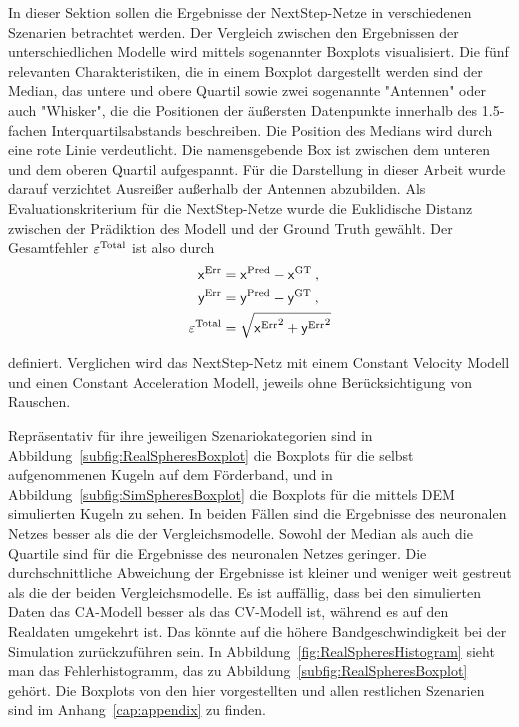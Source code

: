 In dieser Sektion sollen die Ergebnisse der NextStep-Netze in verschiedenen Szenarien betrachtet werden.
Der Vergleich zwischen den Ergebnissen der unterschiedlichen Modelle wird mittels sogenannter Boxplots visualisiert.
Die fünf relevanten Charakteristiken, die in einem Boxplot dargestellt werden sind 
der Median, das untere und obere Quartil sowie zwei sogenannte "Antennen" oder auch "Whisker", die die Positionen der äußersten Datenpunkte innerhalb des 1.5-fachen Interquartilsabstands beschreiben.
Die Position des Medians wird durch eine rote Linie verdeutlicht.
Die namensgebende Box ist zwischen dem unteren und dem oberen Quartil aufgespannt.
Für die Darstellung in dieser Arbeit wurde darauf verzichtet Ausreißer außerhalb der Antennen abzubilden.
Als Evaluationskriterium für die NextStep-Netze wurde die Euklidische Distanz zwischen der Prädiktion des Modell und der Ground Truth gewählt.
Der Gesamtfehler \(\varepsilon{^{\text{Total}}} \) ist also durch 
% 
\begin{align*}
    \mathsf{x}{^{\text{Err}}} &=  \mathsf{x}{^{\text{Pred}}} -  \mathsf{x}{^{\text{GT}}} \: ,\\
    \mathsf{y}{^{\text{Err}}} &=  \mathsf{y}{^{\text{Pred}}} -  \mathsf{y}{^{\text{GT}}} \: ,\\
    \varepsilon{^{\text{Total}}} &= \sqrt{ \mathsf{x}{^{\text{Err}}}^2 +  \mathsf{y}{^{\text{Err}}}^2}
\end{align*}

definiert. Verglichen wird das NextStep-Netz mit einem Constant Velocity Modell und einen Constant Acceleration Modell, jeweils ohne Berücksichtigung von Rauschen. 

Repräsentativ für ihre jeweiligen Szenariokategorien sind in Abbildung~\ref{subfig:RealSpheresBoxplot} die Boxplots für die selbst aufgenommenen Kugeln auf dem Förderband,
und in Abbildung~\ref{subfig:SimSpheresBoxplot} die Boxplots für die mittels DEM simulierten Kugeln zu sehen.
In beiden Fällen sind die Ergebnisse des neuronalen Netzes besser als die der Vergleichsmodelle.
Sowohl der Median als auch die Quartile sind für die Ergebnisse des neuronalen Netzes geringer.
Die durchschnittliche Abweichung der Ergebnisse ist kleiner und weniger weit gestreut als die der beiden Vergleichsmodelle.
Es ist auffällig, dass bei den simulierten Daten das CA-Modell besser als das CV-Modell ist, während es auf den Realdaten umgekehrt ist.
Das könnte auf die höhere Bandgeschwindigkeit bei der Simulation zurückzuführen sein. 
In Abbildung~\ref{fig:RealSpheresHistogram} sieht man das Fehlerhistogramm, das zu Abbildung~\ref{subfig:RealSpheresBoxplot} gehört.
Die Boxplots von den hier vorgestellten und allen restlichen Szenarien sind im Anhang~\ref{cap:appendix} zu finden.

